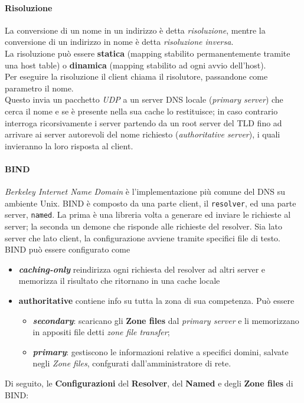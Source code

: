 \documentclass[a4paper,11pt]{article}
\def\code#1{\texttt{#1}}
\def\italic#1{\textit{#1}}
\begin{document}
\paragraph{Risoluzione}
La conversione di un nome in un indirizzo è detta \textit{risoluzione}, mentre la conversione di un indirizzo in nome è detta \textit{risoluzione inversa}.\\
La risoluzione può essere \textbf{statica} (mapping stabilito permanentemente tramite una host table) o \textbf{dinamica} (mapping stabilito ad ogni avvio dell'host).\\
Per eseguire la risoluzione il client chiama il risolutore, passandone come parametro il nome. \\Questo invia un pacchetto \textit{UDP} a un server DNS locale (\textit{primary server}) che cerca il nome e se è presente nella sua cache lo restituisce; in caso contrario interroga ricorsivamente i server partendo da un root server del TLD fino ad arrivare ai server autorevoli del nome richiesto (\textit{authoritative server}), i quali invieranno la loro risposta al client.

\paragraph{BIND} \textit{Berkeley Internet Name Domain} è l'implementazione più comune del DNS su ambiente Unix. BIND è composto da una parte client, il \code{resolver}, ed una parte server, \code{named}. La prima è una libreria volta a generare ed inviare le richieste al server; la seconda un demone che risponde alle richieste del resolver. Sia lato server che lato client, la configurazione avviene tramite specifici file di testo.\\
BIND può essere configurato come 
\begin{itemize}
\item \italic{\textbf{caching-only}} reindirizza ogni richiesta del resolver ad altri server e memorizza il risultato che ritornano in una cache locale
\item \textbf{authoritative} contiene info su tutta la zona di sua competenza. Può essere 
\begin{itemize}
\item \italic{\textbf{secondary}}: scaricano gli \textbf{Zone files} dal \italic{primary server} e li memorizzano in appositi file detti \italic{zone file transfer};
\item \italic{\textbf{primary}}: gestiscono le informazioni relative a specifici domini, salvate negli \textit{Zone files}, confgurati dall'amministratore di rete.
\end{itemize}
\end{itemize}
Di seguito, le \textbf{Configurazioni} del \textbf{Resolver}, del \textbf{Named} e degli \textbf{Zone files} di BIND:
\end{document}
